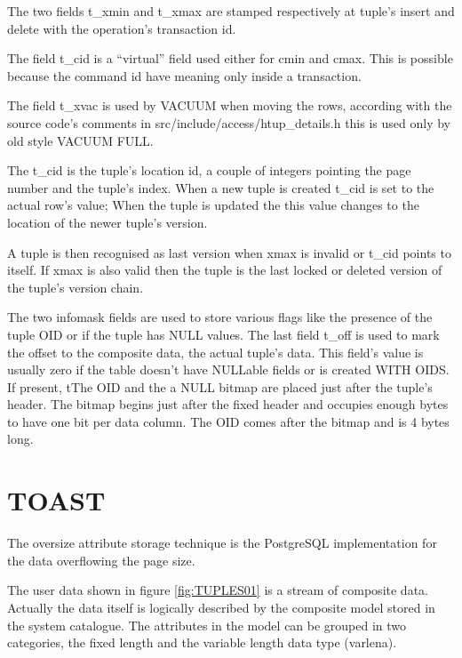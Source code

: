 The two fields t\_xmin and t\_xmax are stamped 
respectively at tuple's insert and delete with the operation's transaction 
id.\newline 

The field t\_cid is a ``virtual'' field used either for cmin and 
cmax. This is 
possible because the command id have meaning only inside a transaction.\newline

The field t\_xvac is used by VACUUM when moving the rows, 
according with the source code's comments in src/include/access/htup\_details.h 
this is used only by old style VACUUM FULL. \newline

The t\_cid is the tuple's location id, a couple of integers 
pointing the page number and the tuple's index. When a new tuple is created 
t\_cid is set to the actual row's value; When the tuple is updated the this 
value changes to the location of the newer tuple's version. \newline

A tuple is then recognised as last version when xmax is invalid or t\_cid 
points to itself. If xmax is also valid then the tuple is the last locked or 
deleted version of the tuple's version chain.\newline

The two infomask fields are used to store various flags like the presence of the tuple OID or if 
the 
tuple has NULL values.\newline
The last field t\_off is used to mark the offset to the composite data, the actual tuple's data. 
This field's value is usually zero if the table doesn't have NULLable fields or is created WITH 
OIDS. If present, tThe OID and the a NULL bitmap are placed just after the tuple's header. The 
bitmap begins just after the fixed header and occupies enough bytes to have one bit per data 
column. 
The OID comes after the bitmap and is 4 bytes long.


\section{TOAST}
\label{sec:TOAST}
The oversize attribute storage technique is the PostgreSQL implementation for the data overflowing 
the page size.\newline

The user data shown in figure \ref{fig:TUPLES01} is a stream of composite data. Actually the data 
itself is logically described by the composite model stored in the system catalogue. The attributes 
in the model can be grouped in two categories, the fixed length and the variable length data type 
(varlena).\newline

